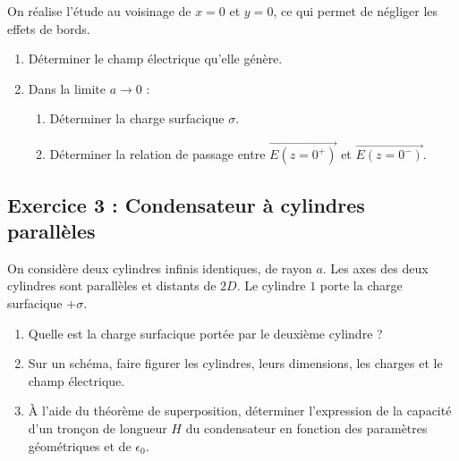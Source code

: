 On réalise l'étude au voisinage de $x = 0$ et $y = 0$, ce qui permet de négliger les effets de bords. 

\begin{enumerate}
	\item Déterminer le champ électrique qu'elle génère.
	\item Dans la limite $a \longrightarrow 0$ :
	\begin{enumerate}
		\item Déterminer la charge surfacique $\sigma$.
		\item Déterminer la relation de passage entre $\overrightarrow{E(z=0^+)}$ et $\overrightarrow{E(z=0^-)}$.
	\end{enumerate}
\end{enumerate}

\subsection{Exercice 3 : Condensateur à cylindres parallèles}

On considère deux cylindres infinis identiques, de rayon $a$. Les axes des deux cylindres sont parallèles et distants de $2 D$. Le cylindre $1$ porte la charge surfacique $+\sigma$.

\begin{enumerate}
	\item Quelle est la charge surfacique portée par le deuxième cylindre ?
	\item Sur un schéma, faire figurer les cylindres, leurs dimensions, les charges et le champ électrique.
	\item À l'aide du théorème de superposition, déterminer l'expression de la capacité d'un tronçon de longueur $H$ du condensateur en fonction des paramètres géométriques et de $\epsilon_0$.
\end{enumerate}
